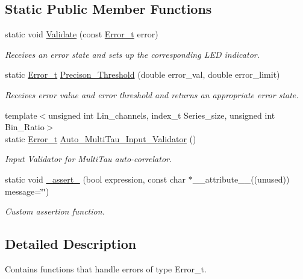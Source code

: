 \subsection*{Static Public Member Functions}
\begin{DoxyCompactItemize}
\item 
static void \hyperlink{classErrors_a9e43e14a2d0834f192b954cce71c387b}{Validate} (const \hyperlink{errors_8hpp_a4e8c0d09726859e3d3369c0da5a1aa7f}{Error\+\_\+t} error)
\begin{DoxyCompactList}\small\item\em Receives an error state and sets up the corresponding L\+ED indicator. \end{DoxyCompactList}\item 
static \hyperlink{errors_8hpp_a4e8c0d09726859e3d3369c0da5a1aa7f}{Error\+\_\+t} \hyperlink{classErrors_a1568635c69e70e2422a5a632d8d6809d}{Precison\+\_\+\+Threshold} (double error\+\_\+val, double error\+\_\+limit)
\begin{DoxyCompactList}\small\item\em Receives error value and error threshold and returns an appropriate error state. \end{DoxyCompactList}\item 
{\footnotesize template$<$unsigned int Lin\+\_\+channels, index\+\_\+t Series\+\_\+size, unsigned int Bin\+\_\+\+Ratio$>$ }\\static \hyperlink{errors_8hpp_a4e8c0d09726859e3d3369c0da5a1aa7f}{Error\+\_\+t} \hyperlink{classErrors_a8578169dc7b56d2080f07a0647f627e1}{Auto\+\_\+\+Multi\+Tau\+\_\+\+Input\+\_\+\+Validator} ()
\begin{DoxyCompactList}\small\item\em Input Validator for Multi\+Tau auto-\/correlator. \end{DoxyCompactList}\item 
static void \hyperlink{classErrors_a3618ed0e7aba69be0759fa821a987b3b}{\+\_\+assert\+\_\+} (bool expression, const char $\ast$\+\_\+\+\_\+attribute\+\_\+\+\_\+((unused)) message=\char`\"{}\char`\"{})
\begin{DoxyCompactList}\small\item\em Custom assertion function. \end{DoxyCompactList}\end{DoxyCompactItemize}


\subsection{Detailed Description}
Contains functions that handle errors of type {\ttfamily Error\+\_\+t}. 

